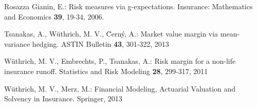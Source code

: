 \documentclass[11pt,a4paper]{article}
\begin{document}
\begin{thebibliography}{}
Rosazza Gianin, E.:
Risk measures via g-expectations.
Insurance: Mathematics and Economics {\bf 39}, 19-34, 2006.

Tsanakas, A., W{\"u}thrich, M. V., {\u{C}}ern{\'y}, A.:  
Market value margin via mean-variance hedging. 
ASTIN Bulletin {\bf 43}, 301-322, 2013

W\"uthrich, M. V., Embrechts, P., Tsanakas, A.:
Risk margin for a non-life insurance runoff.
Statistics and Risk Modeling {\bf 28}, 299-317, 2011

W\"uthrich, M. V., Merz, M.:
Financial Modeling, Actuarial Valuation and Solvency in Insurance.
Springer, 2013  

\end{thebibliography}
\end{document}
